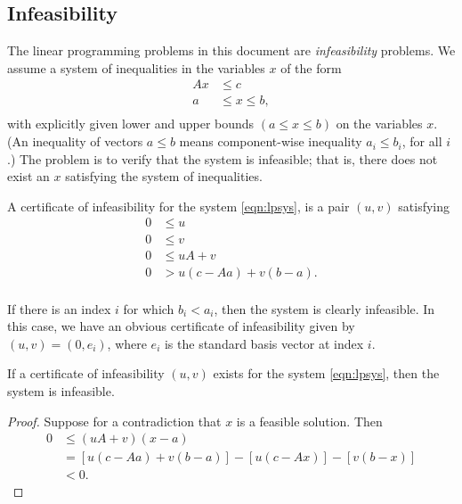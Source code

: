 \subsection{Infeasibility}


The linear programming problems in this document are {\it
infeasibility} problems.  We assume a system of inequalities in
the variables $x$ of the form
    \begin{equation}
    \label{eqn:lpsys}
    \begin{array}{lll}
    A x &\le c\\
    a &\le x \le b,\\
    \end{array}
    \end{equation}
with explicitly given lower and upper bounds $(a\le x\le b)$ on
the variables $x$. (An inequality of vectors $a\le b$ means
component-wise inequality $a_i\le b_i$, for all $i$.) The problem
is to verify that the system is infeasible; that is, there does
not exist an $x$ satisfying the system of inequalities.

\begin{definition}
  A certificate of infeasibility for the system \ref{eqn:lpsys},
  is a pair $(u,v)$ satisfying
    $$
    \begin{array}{lll}
    0&\le u\\
    0&\le v\\
    0&\le u A + v\\
    0& > u(c-Aa) + v(b-a). \\
    \end{array}
    $$
\end{definition}

\begin{example}
If there is an index $i$ for which $b_i < a_i$, then the system is
clearly infeasible.  In this case, we have an obvious certificate
of infeasibility given by $(u,v)=(0,e_i)$, where $e_i$ is the
standard basis vector at index $i$.
\end{example}

\begin{lemma}
  If a certificate of infeasibility $(u,v)$ exists for the system
  \ref{eqn:lpsys}, then the system is infeasible.
\end{lemma}

\begin{proof}
    Suppose for a contradiction that $x$ is a feasible solution.
    Then
    $$
    \begin{array}{lll}
    0 &\le (u A + v)(x-a) \\
      &= [u (c- A a) + v (b- a)] - [u (c - A x)] - [v (b - x)]\\
      &< 0.
    \end{array}
    $$
\end{proof}


